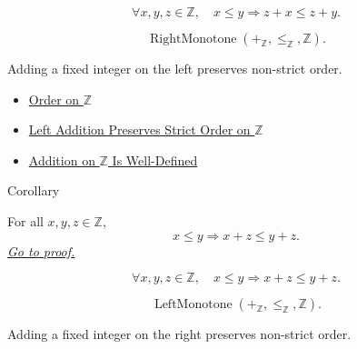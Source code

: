 \begin{remark*}
\[
\forall x,y,z\in\mathbb{Z},\quad
x\le y \Longrightarrow z+x\le z+y.
\]
\end{remark*}

\begin{remark*}
\[
\operatorname{RightMonotone}(+_{\mathbb{Z}},\le_{\mathbb{Z}},\mathbb{Z}).
\]
\end{remark*}

\begin{remark*}[Interpretation]
Adding a fixed integer on the left preserves non-strict order.
\end{remark*}

\begin{dependencies}
\begin{itemize}
  \item \hyperref[def:order-on-z]{Order on $\mathbb{Z}$}
  \item \hyperref[thm:left-addition-preserves-strict-order-on-z]{Left Addition Preserves Strict Order on $\mathbb{Z}$}
  \item \hyperref[thm:addition-on-z-well-defined]{Addition on $\mathbb{Z}$ Is Well-Defined}
\end{itemize}
\end{dependencies}

\begin{corollarybox}{Corollary}
\begin{corollary}
\label{cor:right-addition-preserves-order-on-z}
For all $x,y,z\in\mathbb{Z}$,
\[
x\le y \Longrightarrow x+z\le y+z.
\]
\hyperref[prf:right-addition-preserves-order-on-z]{\textit{Go to proof.}}
\end{corollary}
\end{corollarybox}

\begin{remark*}
\[
\forall x,y,z\in\mathbb{Z},\quad
x\le y \Longrightarrow x+z\le y+z.
\]
\end{remark*}

\begin{remark*}
\[
\operatorname{LeftMonotone}(+_{\mathbb{Z}},\le_{\mathbb{Z}},\mathbb{Z}).
\]
\end{remark*}

\begin{remark*}[Interpretation]
Adding a fixed integer on the right preserves non-strict order.
\end{remark*}

